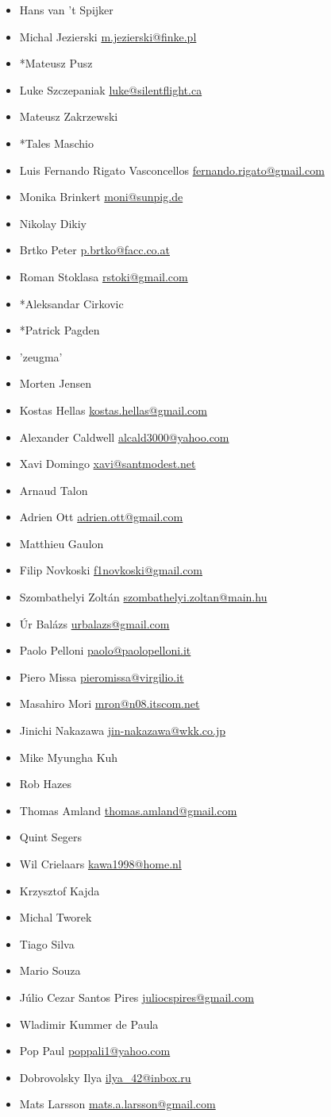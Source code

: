 \begin{itemize}
\item Hans van 't Spijker
\item Michal Jezierski \url{m.jezierski@finke.pl}
\item*Mateusz Pusz
\item Luke Szczepaniak \url{luke@silentflight.ca}
\item Mateusz Zakrzewski
\item*Tales Maschio
\item Luis Fernando Rigato Vasconcellos \url{fernando.rigato@gmail.com}
\item Monika Brinkert \url{moni@sunpig.de}
\item Nikolay Dikiy
\item Brtko Peter \url{p.brtko@facc.co.at}
\item Roman Stoklasa \url{rstoki@gmail.com}
\item*Aleksandar Cirkovic
\item*Patrick Pagden
\item 'zeugma'
\item Morten Jensen
\item Kostas Hellas \url{kostas.hellas@gmail.com}
\item Alexander Caldwell \url{alcald3000@yahoo.com}
\item Xavi Domingo \url{xavi@santmodest.net}
\item Arnaud Talon
\item Adrien Ott \url{adrien.ott@gmail.com}
\item Matthieu Gaulon
\item Filip Novkoski \url{f1novkoski@gmail.com}
\item Szombathelyi Zolt\'an \url{szombathelyi.zoltan@main.hu}
\item \'Ur Bal\'azs \url{urbalazs@gmail.com}
\item Paolo Pelloni \url{paolo@paolopelloni.it}
\item Piero Missa \url{pieromissa@virgilio.it}
\item Masahiro Mori \url{mron@n08.itscom.net}
\item Jinichi Nakazawa \url{jin-nakazawa@wkk.co.jp}
\item Mike Myungha Kuh
\item Rob Hazes
\item Thomas Amland \url{thomas.amland@gmail.com}
\item Quint Segers
\item Wil Crielaars \url{kawa1998@home.nl}
\item Krzysztof Kajda
\item Michal Tworek %
\item Tiago Silva
\item Mario Souza
\item J\'ulio Cezar Santos Pires \url{juliocspires@gmail.com}
\item Wladimir Kummer de Paula
\item Pop Paul \url{poppali1@yahoo.com}
\item Dobrovolsky Ilya \url{ilya_42@inbox.ru}
\item Mats Larsson \url{mats.a.larsson@gmail.com}
\end{itemize}
